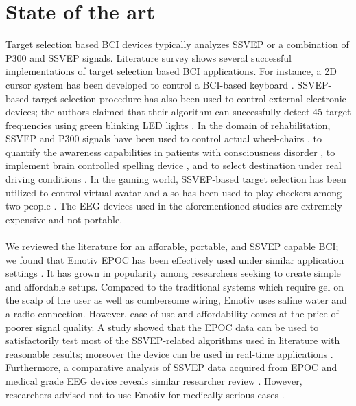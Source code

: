 \documentclass{svmult}
\begin{document}
\section{State of the art}
\label{sec:soa}
Target selection based BCI devices typically analyzes SSVEP or a combination of P300 and SSVEP signals. Literature survey shows several successful implementations of target selection based BCI applications. For instance, a 2D cursor system has been developed to control a BCI-based keyboard \cite{yin2015hybrid}. SSVEP-based target selection procedure has also been used to control external electronic devices; the authors claimed that their algorithm can successfully detect 45 target frequencies using green blinking LED lights \cite{SSVEPfiability}. In the domain of rehabilitation, SSVEP and P300 signals have been used to control actual wheel-chairs \cite{paper4}, to quantify the awareness capabilities in patients with consciousness disorder \cite{paper8}, to implement brain controlled spelling device \cite{paper2}, and to select destination under real driving conditions \cite{car}. In the gaming world, SSVEP-based target selection has been utilized to control virtual avatar \cite{paper_5} and also has been used to play checkers among two people \cite{paper6}. The EEG devices used in the aforementioned studies are extremely expensive and not portable.\\
\\
We reviewed the literature for an afforable, portable, and SSVEP capable BCI; we found that Emotiv EPOC has been effectively used under similar application settings \cite{jian2014improving, van2012designing}. It has grown in popularity among researchers seeking to create simple and affordable setups. Compared to the traditional systems which require gel on the scalp of the user as well as cumbersome wiring, Emotiv uses saline water and a radio connection. However, ease of use and affordability comes at the price of poorer signal quality. A study showed that the EPOC data can be used to satisfactorily test most of the SSVEP-related algorithms used in literature with reasonable results; moreover the device can be used in real-time applications \cite{hvaring2014comparison}. Furthermore, a comparative analysis of SSVEP data acquired from EPOC and medical grade EEG device reveals similar researcher review \cite{liu2012implementation}. However, researchers advised not to use Emotiv for medically serious cases \cite{duvinage2013performance}.\\
\\
\end{document}

